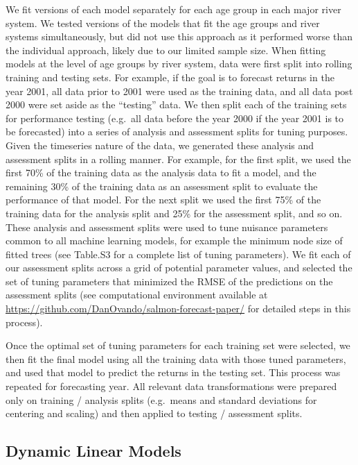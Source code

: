 \documentclass[
]{article}
\begin{document}
We fit versions of each model separately for each age group in each major river system. We tested versions of the models that fit the age groups and river systems simultaneously, but did not use this approach as it performed worse than the individual approach, likely due to our limited sample size. When fitting models at the level of age groups by river system, data were first split into rolling training and testing sets. For example, if the goal is to forecast returns in the year 2001, all data prior to 2001 were used as the training data, and all data post 2000 were set aside as the ``testing'' data. We then split each of the training sets for performance testing (e.g.~all data before the year 2000 if the year 2001 is to be forecasted) into a series of analysis and assessment splits for tuning purposes. Given the timeseries nature of the data, we generated these analysis and assessment splits in a rolling manner. For example, for the first split, we used the first 70\% of the training data as the analysis data to fit a model, and the remaining 30\% of the training data as an assessment split to evaluate the performance of that model. For the next split we used the first 75\% of the training data for the analysis split and 25\% for the assessment split, and so on. These analysis and assessment splits were used to tune nuisance parameters common to all machine learning models, for example the minimum node size of fitted trees (see Table.S3 for a complete list of tuning parameters). We fit each of our assessment splits across a grid of potential parameter values, and selected the set of tuning parameters that minimized the RMSE of the predictions on the assessment splits (see computational environment available at \url{https://github.com/DanOvando/salmon-forecast-paper/} for detailed steps in this process).

Once the optimal set of tuning parameters for each training set were selected, we then fit the final model using all the training data with those tuned parameters, and used that model to predict the returns in the testing set. This process was repeated for forecasting year. All relevant data transformations were prepared only on training / analysis splits (e.g.~means and standard deviations for centering and scaling) and then applied to testing / assessment splits.

\hypertarget{dynamic-linear-models}{%
\subsection{Dynamic Linear Models}\label{dynamic-linear-models}}
\end{document}
